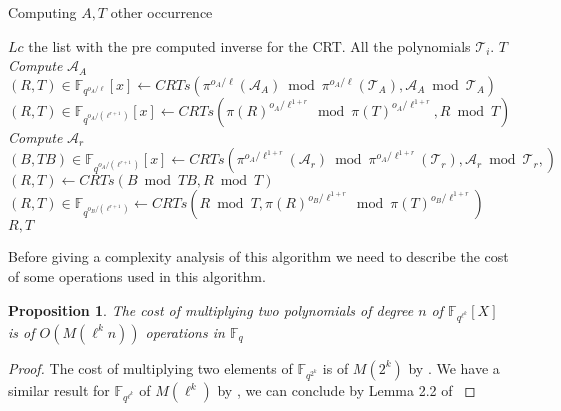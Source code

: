 \documentclass{lms}
\newtheorem{prop}[thm]{Proposition}
\begin{document}
\begin{algorithm}
\caption{\label{computingT2ir}Computing $A,T$ other occurrence}
\begin{algorithmic}[5]
\REQUIRE $Lc$ the list with the pre computed inverse for the CRT. All the polynomials $\mathcal{T}_i$.
\ENSURE $T$
\STATE \textit{Compute} $\mathcal{A}_A$ %
\STATE $\left( R,T \right) \in \mathbb{F}_{q^{o_A/\ell}}[x] \gets CRTs \left( \pi^{o_A/\ell}(\mathcal{A}_A) \bmod  \pi^{o_A/\ell}(\mathcal{T}_A),\mathcal{A}_A \bmod \mathcal{T}_A \right)$
\STATE $\left( R , T \right) \in \mathbb{F}_{q^{o_A/(\ell^{r+1})}}[x] \gets CRTs \left( \pi(R)^{o_A/\ell^{1+r}} \bmod \pi(T)^{o_A/\ell^{1+r}}, R \bmod T \right) $
\STATE \textit{Compute} $\mathcal{A}_r$%
\STATE $\left( B,TB \right)\in \mathbb{F}_{q^{o_A/(\ell^{r+1})}}[x]  \gets CRTs \left( \pi^{o_A/\ell^{1+r}}(\mathcal{A}_r) \bmod \pi^{o_A/\ell^{1+r}} (\mathcal{T}_r),\mathcal{A}_r \bmod \mathcal{T}_r, \right)$
\STATE $\left( R,T \right) \gets CRTs \left(B \bmod TB, R \bmod T \right) $
\ENDFOR
{}%
\STATE $\left( R , T \right)\in \mathbb{F}_{q^{o_B/(\ell^{r+1})}} \gets CRTs \left( R \bmod T ,\pi(R)^{o_B/\ell^{1+r}} \bmod \pi(T)^{o_B/\ell^{1+r}} \right)$
\ENDFOR
\RETURN $R,T$
\end{algorithmic}
\end{algorithm}

Before giving a complexity analysis of this algorithm we need to describe the cost of some operations used in this algorithm.

\begin{prop}
The cost of multiplying two polynomials of degree $n$ of $\mathbb{F}_{q^{\ell^k}}[X] $ is of $O(M(\ell^kn))$ operations in $\mathbb{F}_q$
\end{prop}

\begin{proof}
The cost of multiplying two elements of $\mathbb{F}_{q^{2^k}}$ is of $M(2^k)$ by \cite{DoSc12}. We have a similar result for $\mathbb{F}_{q^{\ell^k}}$ of $M(\ell^k)$ by \cite{DeDoSc13}, we can conclude by Lemma 2.2 of \cite{vzgathen+shoup92}
\end{proof}
\end{document}
